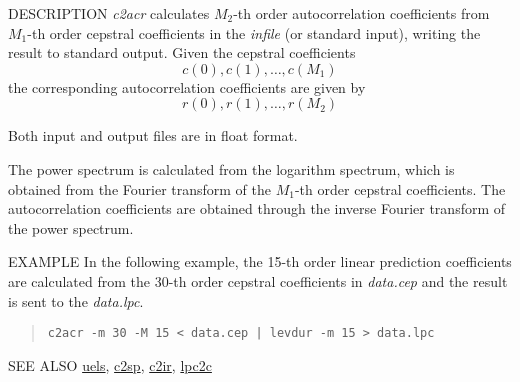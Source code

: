 \begin{synopsis}
\item[c2acr] [ --m $M_1$ ] [ --M $M_2$ ] [ --l $L$ ] [ {\em infile} ]
\end{synopsis}

\begin{qsection}{DESCRIPTION}
{\em c2acr} calculates $M_2$-th order autocorrelation coefficients 
from $M_1$-th order cepstral coefficients in the {\em infile} (or standard input),
 writing the result to standard output.
Given the cepstral coefficients
\begin{displaymath}
c(0), c(1), \ldots, c(M_1)
\end{displaymath}
the corresponding autocorrelation coefficients are given by
\begin{displaymath}
r(0), r(1), \ldots, r(M_2)
\end{displaymath}

Both input and output files are in float format.

The power spectrum is calculated from the logarithm spectrum,
which is obtained from the Fourier transform of the $M_1$-th
order cepstral coefficients.
The autocorrelation coefficients are obtained through the inverse
Fourier transform of the power spectrum.
\end{qsection}

\begin{options}
\end{options}

\begin{qsection}{EXAMPLE}
In the following example,
the 15-th order linear prediction coefficients are calculated from
the 30-th order cepstral coefficients in {\em data.cep}
and the result is sent to the {\em data.lpc}.
\begin{quote}
  \verb!c2acr -m 30 -M 15 < data.cep | levdur -m 15 > data.lpc!
\end{quote}
\end{qsection}

\begin{qsection}{SEE ALSO}
\hyperlink{uels}{uels},
\hyperlink{c2sp}{c2sp},
\hyperlink{c2ir}{c2ir},
\hyperlink{lpc2c}{lpc2c}
\end{qsection}
